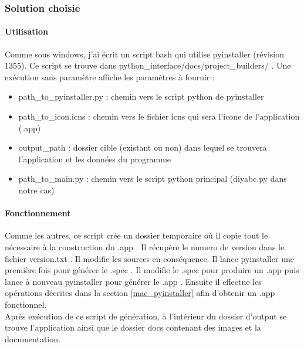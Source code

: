 \documentclass[12pt,a4paper]{article}
\begin{document}
        \subsubsection{Solution choisie}
        \paragraph{Utilisation}

        Comme sous windows, j'ai écrit un script bash qui utilise pyinstaller
        (révision 1355). Ce script se trouve dans
        python\_interface/docs/project\_builders/ .  Une exécution sans
        paramètre affiche les paramètres à fournir : \\

        \begin{itemize}
            \item path\_to\_pyinstaller.py : chemin vers le script python de pyinstaller
            \item path\_to\_icon.icns : chemin vers le fichier icns qui sera l'icone de l'application (.app)
            \item output\_path : dossier cible (existant ou non) dans lequel se trouvera l'application et les données du programme
            \item path\_to\_main.py : chemin vers le script python principal (diyabc.py dans notre cas)\\
        \end{itemize}

        \paragraph{Fonctionnement}

        Comme les autres, ce script crée un dossier temporaire où il copie tout
        le nécessaire à la construction du .app .  Il récupère le numero de
        version dans le fichier version.txt . Il modifie les sources en
        conséquence. Il lance pyinstaller une première fois pour générer le
        .spec . Il modifie le .spec pour produire un .app puis lance à nouveau
        pyinstaller pour générer le .app .  Ensuite il effectue les opérations
        décrites dans la section \ref{mac_pyinstaller} afin d'obtenir un .app
        fonctionnel.\\

        Après exécution de ce script de génération, à l'intérieur du dossier
        d'output se trouve l'application ainsi que le dossier docs contenant des
        images et la documentation.
\end{document}
